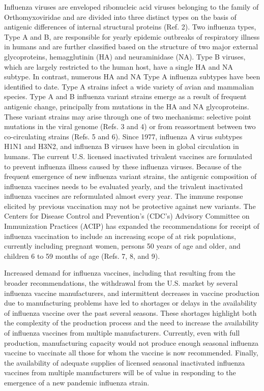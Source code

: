 \cite{GuidanceIndustryClinical2007}
Influenza viruses are enveloped ribonucleic acid viruses belonging to the family of
Orthomyxoviridae and are divided into three distinct types on the basis of antigenic differences
of internal structural proteins (Ref. 2). Two influenza types, Type A and B, are responsible for
yearly epidemic outbreaks of respiratory illness in humans and are further classified based on the
structure of two major external glycoproteins, hemagglutinin (HA) and neuraminidase (NA).
Type B viruses, which are largely restricted to the human host, have a single HA and NA
subtype. In contrast, numerous HA and NA Type A influenza subtypes have been identified to
date. Type A strains infect a wide variety of avian and mammalian species.
Type A and B influenza variant strains emerge as a result of frequent antigenic change,
principally from mutations in the HA and NA glycoproteins. These variant strains may arise
through one of two mechanisms: selective point mutations in the viral genome (Refs. 3 and 4) or
from reassortment between two co-circulating strains (Refs. 5 and 6).
Since 1977, influenza A virus subtypes H1N1 and H3N2, and influenza B viruses have been in
global circulation in humans. The current U.S. licensed inactivated trivalent vaccines are
formulated to prevent influenza illness caused by these influenza viruses. Because of the
frequent emergence of new influenza variant strains, the antigenic composition of influenza
vaccines needs to be evaluated yearly, and the trivalent inactivated influenza vaccines are
reformulated almost every year. The immune response elicited by previous vaccination may not
be protective against new variants.
The Centers for Disease Control and Prevention’s (CDC’s) Advisory Committee on
Immunization Practices (ACIP) has expanded the recommendations for receipt of influenza
vaccination to include an increasing scope of at risk populations, currently including pregnant
women, persons 50 years of age and older, and children 6 to 59 months of age (Refs. 7, 8, and 9).

Increased demand for influenza vaccines, including that resulting from the broader
recommendations, the withdrawal from the U.S. market by several influenza vaccine
manufacturers, and intermittent decreases in vaccine production due to manufacturing problems
have led to shortages or delays in the availability of influenza vaccine over the past several
seasons. These shortages highlight both the complexity of the production process and the need
to increase the availability of influenza vaccines from multiple manufacturers. Currently, even
with full production, manufacturing capacity would not produce enough seasonal influenza
vaccine to vaccinate all those for whom the vaccine is now recommended. Finally, the
availability of adequate supplies of licensed seasonal inactivated influenza vaccines from
multiple manufacturers will be of value in responding to the emergence of a new pandemic
influenza strain.

